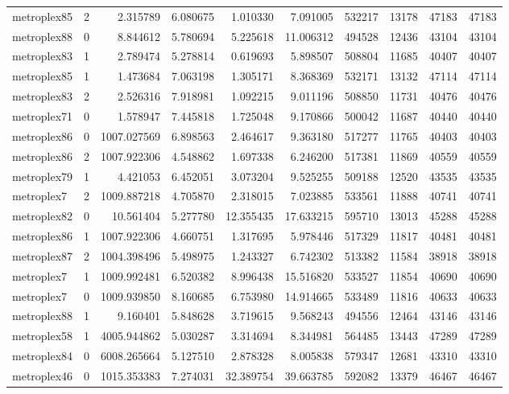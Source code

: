 \begin{longtable}{|l|r|r|r|r|r|r|r|r|r|}
metroplex85 & 2 & 2.315789 & 6.080675 & 1.010330 & 7.091005 & 532217 & 13178 & 47183 & 47183 \\
metroplex88 & 0 & 8.844612 & 5.780694 & 5.225618 & 11.006312 & 494528 & 12436 & 43104 & 43104 \\
metroplex83 & 1 & 2.789474 & 5.278814 & 0.619693 & 5.898507 & 508804 & 11685 & 40407 & 40407 \\
metroplex85 & 1 & 1.473684 & 7.063198 & 1.305171 & 8.368369 & 532171 & 13132 & 47114 & 47114 \\
metroplex83 & 2 & 2.526316 & 7.918981 & 1.092215 & 9.011196 & 508850 & 11731 & 40476 & 40476 \\
metroplex71 & 0 & 1.578947 & 7.445818 & 1.725048 & 9.170866 & 500042 & 11687 & 40440 & 40440 \\
metroplex86 & 0 & 1007.027569 & 6.898563 & 2.464617 & 9.363180 & 517277 & 11765 & 40403 & 40403 \\
metroplex86 & 2 & 1007.922306 & 4.548862 & 1.697338 & 6.246200 & 517381 & 11869 & 40559 & 40559 \\
metroplex79 & 1 & 4.421053 & 6.452051 & 3.073204 & 9.525255 & 509188 & 12520 & 43535 & 43535 \\
metroplex7 & 2 & 1009.887218 & 4.705870 & 2.318015 & 7.023885 & 533561 & 11888 & 40741 & 40741 \\
metroplex82 & 0 & 10.561404 & 5.277780 & 12.355435 & 17.633215 & 595710 & 13013 & 45288 & 45288 \\
metroplex86 & 1 & 1007.922306 & 4.660751 & 1.317695 & 5.978446 & 517329 & 11817 & 40481 & 40481 \\
metroplex87 & 2 & 1004.398496 & 5.498975 & 1.243327 & 6.742302 & 513382 & 11584 & 38918 & 38918 \\
metroplex7 & 1 & 1009.992481 & 6.520382 & 8.996438 & 15.516820 & 533527 & 11854 & 40690 & 40690 \\
metroplex7 & 0 & 1009.939850 & 8.160685 & 6.753980 & 14.914665 & 533489 & 11816 & 40633 & 40633 \\
metroplex88 & 1 & 9.160401 & 5.848628 & 3.719615 & 9.568243 & 494556 & 12464 & 43146 & 43146 \\
metroplex58 & 1 & 4005.944862 & 5.030287 & 3.314694 & 8.344981 & 564485 & 13443 & 47289 & 47289 \\
metroplex84 & 0 & 6008.265664 & 5.127510 & 2.878328 & 8.005838 & 579347 & 12681 & 43310 & 43310 \\
metroplex46 & 0 & 1015.353383 & 7.274031 & 32.389754 & 39.663785 & 592082 & 13379 & 46467 & 46467 \\

\end{longtable}
